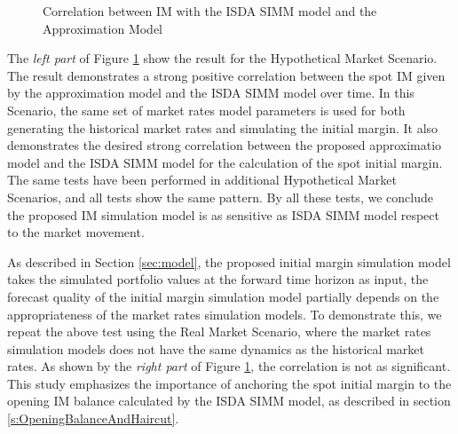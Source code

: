 \documentclass[preprint,12pt]{elsarticle}
\begin{document}
\begin{figure}[h] 
\hfill
{}
\hfill
{}
\hfill
\caption{Correlation between IM with the ISDA SIMM model and the Approximation Model}
\label{fig:correlation_plot}
\end{figure}

The \emph{left part} of Figure \ref{fig:correlation_plot} show the result for the Hypothetical Market Scenario. The result demonstrates a strong positive correlation between the spot IM given by the approximation model and the ISDA SIMM model over time. In this Scenario, the same set of market rates model parameters is used for both generating the historical market rates and simulating the initial margin. It also demonstrates the desired strong correlation between the proposed approximatio model and the ISDA SIMM model for the calculation of the spot initial margin. The same tests have been performed in additional Hypothetical Market Scenarios, and all tests show the same pattern. By all these tests, we conclude the proposed IM simulation model is as sensitive as ISDA SIMM model respect to the market movement. 

As described in Section \ref{sec:model}, the proposed initial margin simulation model takes the simulated portfolio values at the forward time horizon as input, the forecast quality of the initial margin simulation model partially depends on the appropriateness of the market rates simulation models. To demonstrate this, we repeat the above test using the Real Market Scenario, where the market rates simulation models does not have the same dynamics as the historical market rates. As shown by the \emph{right part} of Figure \ref{fig:correlation_plot}, the correlation is not as significant. This study emphasizes the importance of anchoring the spot initial margin to the opening IM balance calculated by the ISDA SIMM model, as  described in section \ref{s:OpeningBalanceAndHaircut}.
\end{document}
